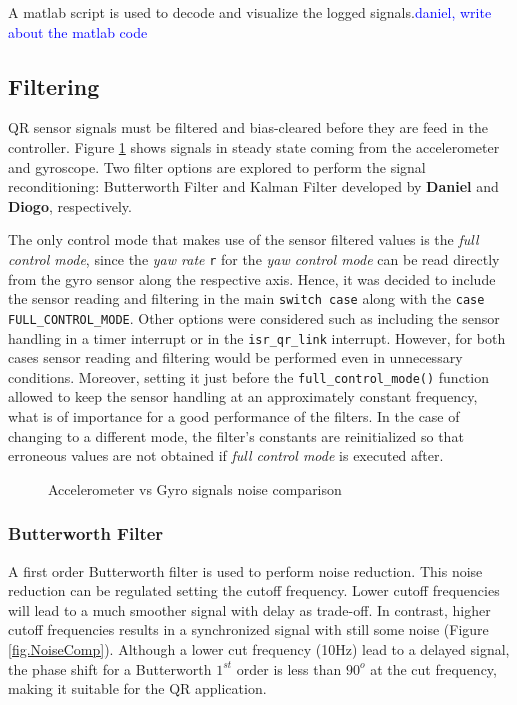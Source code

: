 \documentclass{article}
\newcommand\todo[1]{\textcolor{blue}{#1}} %
\begin{document}
A matlab script is used to decode and visualize the logged signals.\todo{daniel, write about the matlab code}


\subsection{Filtering}
\label{sec:filtering}

QR sensor signals must be filtered and bias-cleared before they are feed in the controller. Figure \ref{fig.Noise} shows signals in steady state coming from the accelerometer and gyroscope. Two filter options are explored to perform the signal reconditioning: Butterworth Filter and Kalman Filter developed by \textbf{Daniel} and \textbf{Diogo}, respectively.

The only control mode that makes use of the sensor filtered values is the \textit{full control mode}, since the \textit{yaw rate} \texttt{r} for the \textit{yaw control mode} can be read directly from the gyro sensor along the respective axis. Hence, it was decided to include the sensor reading and filtering in the main \texttt{switch case} along with the \texttt{case FULL\_CONTROL\_MODE}. Other options were considered such as including the sensor handling in a timer interrupt or in the \texttt{isr\_qr\_link} interrupt. However, for both cases sensor reading and filtering would be performed even in unnecessary conditions. Moreover, setting it just before the \texttt{full\_control\_mode()} function allowed to keep the sensor handling at an approximately constant frequency, what is of importance for a good performance of the filters. In the case of changing to a different mode, the filter's constants are reinitialized so that erroneous values are not obtained if \textit{full control mode} is executed after.

\begin{figure}[ht]
\centering
	\caption{Accelerometer vs Gyro signals noise comparison}
	\label{fig.Noise}
\end{figure}

\subsubsection{Butterworth Filter}

A first order Butterworth filter is used to perform noise reduction. This noise reduction can be regulated setting the cutoff frequency. Lower cutoff frequencies will lead to a much smoother signal with delay as trade-off. In contrast, higher cutoff frequencies results in a synchronized signal with still some noise (Figure \ref{fig.NoiseComp}). Although a lower cut frequency (10Hz) lead to a delayed signal, the phase shift for a Butterworth $1^{st}$ order is less than $90^{o}$ at the cut frequency, making it suitable for the QR application. 
\end{document}
